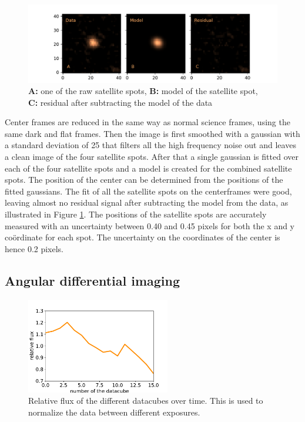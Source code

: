 \documentclass[twoside,single]{lion-msc}
\begin{document}
\begin{figure}[!b]
\centering 
\includegraphics[width = \textwidth]{resultmodel}
\caption{\textbf{A:} one of the raw satellite spots, \textbf{B:} model of the satellite spot,\\ \textbf{C:} residual after subtracting the model of the data} 
\label{fig:resultmodel}
\end{figure}
\bigskip
Center frames are reduced in the same way as normal science frames, using the same dark and flat frames. Then the image is first smoothed with a gaussian with a standard deviation of 25 that filters all the high frequency noise out and leaves a clean image of the four satellite spots. After that a single gaussian is fitted over each of the four satellite spots and a model is created for the combined satellite spots. The position of the center can be determined from the positions of the fitted gaussians. The fit of all the satellite spots on the centerframes were good, leaving almost no residual signal after subtracting the model from the data, as illustrated in Figure \ref{fig:resultmodel}. The positions of the satellite spots are accurately measured with an uncertainty between 0.40 and 0.45 pixels for both the x and y co\"ordinate for each spot. The uncertainty on the coordinates of the center is hence 0.2 pixels.

\subsection{Angular differential imaging}

\begin{figure}
\centering
\includegraphics[width = 0.56\textwidth]{aonorm}
\caption{Relative flux of the different datacubes over time. This is used to normalize the data between different exposures.}
\label{fig:aonorm}
\end{figure}
\end{document}
